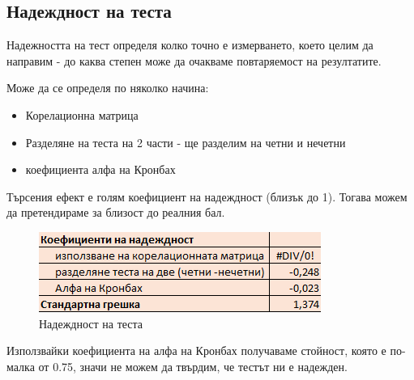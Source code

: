 \subsection{Надеждност на теста}
Надежността на тест определя колко точно е измерването, което целим да направим - до каква степен може да очакваме повтаряемост на резултатите.

Може да се определя по няколко начина:
\begin{itemize}
    \item Корелационна матрица
    \item Разделяне на теста на 2 части - ще разделим на четни и нечетни
    \item коефициента алфа на Кронбах
\end{itemize}
Търсения ефект е голям коефициент на надеждност (близък до 1). Тогава можем да претендираме за близост до реалния бал.
\begin{figure}[H]
    \centering
    \includegraphics[width=\linewidth/2]{resources/nadezhdnost.png}
    \caption{Надеждност на теста}
\end{figure}
Използвайки коефициента на алфа на Кронбах получаваме стойност, която е по-малка от 0.75, значи не можем да твърдим, че тестът ни е надежден.

